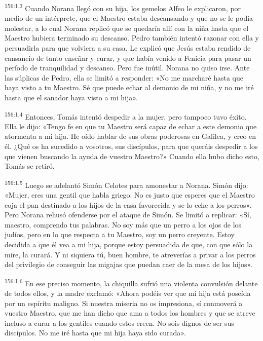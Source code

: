 \par 
\textsuperscript{156:1.3} Cuando Norana llegó con su hija, los gemelos Alfeo le explicaron, por medio de un intérprete, que el Maestro estaba descansando y que no se le podía molestar, a lo cual Norana replicó que se quedaría allí con la niña hasta que el Maestro hubiera terminado su descanso. Pedro también intentó razonar con ella y persuadirla para que volviera a su casa. Le explicó que Jesús estaba rendido de cansancio de tanto enseñar y curar, y que había venido a Fenicia para pasar un período de tranquilidad y descanso. Pero fue inútil. Norana no quiso irse. Ante las súplicas de Pedro, ella se limitó a responder: «No me marcharé hasta que haya visto a tu Maestro. Sé que puede echar al demonio de mi niña, y no me iré hasta que el sanador haya visto a mi hija».

\par 
\textsuperscript{156:1.4} Entonces, Tomás intentó despedir a la mujer, pero tampoco tuvo éxito. Ella le dijo: «Tengo fe en que tu Maestro será capaz de echar a este demonio que atormenta a mi hija. He oído hablar de sus obras poderosas en Galilea, y creo en él. ¿Qué os ha sucedido a vosotros, sus discípulos, para que queráis despedir a los que vienen buscando la ayuda de vuestro Maestro?» Cuando ella hubo dicho esto, Tomás se retiró.

\par 
\textsuperscript{156:1.5} Luego se adelantó Simón Celotes para amonestar a Norana. Simón dijo: «Mujer, eres una gentil que habla griego. No es justo que esperes que el Maestro coja el pan destinado a los hijos de la casa favorecida y se lo eche a los perros». Pero Norana rehusó ofenderse por el ataque de Simón. Se limitó a replicar: «Sí, maestro, comprendo tus palabras. No soy más que un perro a los ojos de los judíos, pero en lo que respecta a tu Maestro, soy un perro creyente. Estoy decidida a que él vea a mi hija, porque estoy persuadida de que, con que sólo la mire, la curará. Y ni siquiera tú, buen hombre, te atreverías a privar a los perros del privilegio de conseguir las migajas que puedan caer de la mesa de los hijos».

\par 
\textsuperscript{156:1.6} En ese preciso momento, la chiquilla sufrió una violenta convulsión delante de todos ellos, y la madre exclamó: «Ahora podéis ver que mi hija está poseída por un espíritu maligno. Si nuestra miseria no os impresiona, sí conmoverá a vuestro Maestro, que me han dicho que ama a todos los hombres y que se atreve incluso a curar a los gentiles cuando estos creen. No sois dignos de ser sus discípulos. No me iré hasta que mi hija haya sido curada».

